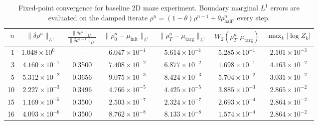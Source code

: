 \documentclass[10pt,a4paper]{article}
\begin{document}
\begin{table}[htbp]
    \centering
    \begin{tabular}{rcccccc}
    \toprule
    $n$ & $\|\delta \rho^n\|_{L^1}$ & $\frac{\|\delta \rho^n\|_{L^1}}{\|\delta \rho^{n-1}\|_{L^1}}$ & $\|\rho_0^n - \mu_{\text{init}}\|_{L^1}$ & $\|\rho_T^n - \mu_{\text{targ}}\|_{L^1}$ & $W_2(\rho_T^n, \mu_{\text{targ}})$ & $\max_k |\log Z_k|$ \\
    \midrule
    1  & $1.048 \times 10^{0\phantom{-}}$  & ---    & $6.047 \times 10^{-1}$ & $5.614 \times 10^{-1}$ & $5.285 \times 10^{-1}$ & $2.101 \times 10^{-3}$ \\
    3  & $4.160 \times 10^{-1}$ & 0.3500 & $7.408 \times 10^{-2}$ & $6.877 \times 10^{-2}$ & $1.698 \times 10^{-1}$ & $4.163 \times 10^{-2}$ \\
    5  & $5.312 \times 10^{-2}$ & 0.3656 & $9.075 \times 10^{-3}$ & $8.424 \times 10^{-3}$ & $5.704 \times 10^{-2}$ & $3.031 \times 10^{-2}$ \\
    10 & $2.227 \times 10^{-3}$ & 0.3496 & $4.766 \times 10^{-5}$ & $4.425 \times 10^{-5}$ & $3.885 \times 10^{-3}$ & $2.865 \times 10^{-2}$ \\
    15 & $1.169 \times 10^{-5}$ & 0.3500 & $2.503 \times 10^{-7}$ & $2.324 \times 10^{-7}$ & $2.693 \times 10^{-4}$ & $2.864 \times 10^{-2}$ \\
    16 & $4.093 \times 10^{-6}$ & 0.3500 & $8.762 \times 10^{-8}$ & $8.133 \times 10^{-8}$ & $1.574 \times 10^{-4}$ & $2.864 \times 10^{-2}$ \\
    \bottomrule

    \end{tabular}
    \small
    \caption{
        Fixed-point convergence for baseline 2D maze experiment. Boundary marginal 
        $L^{1}$ errors are evaluated on the damped iterate $\rho ^{n} =(1-\theta )\rho ^{n-1} +\theta 
        \rho _{\mathrm{half}}^{n}$.
        every step.
    }
    \label{tab:fixed_point}
    \vspace{0.5em}
\end{table}
\end{document}
